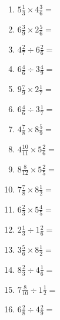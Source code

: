 \documentclass[12pt]{article}
\begin{document}
\begin{enumerate}
\item \large $ 5 \frac{1}{3} \times 4 \frac{3}{6} = $ \vspace{1.6cm}
\item \large $ 6 \frac{3}{9} \times 2 \frac{5}{6} = $ \vspace{1.6cm}
\item \large $ 4 \frac{2}{7} \div 6 \frac{2}{6} = $ \vspace{1.6cm}
\item \large $ 6 \frac{4}{6} \div 3 \frac{4}{9} = $ \vspace{1.6cm}
\item \large $ 9 \frac{7}{9} \times 2 \frac{1}{7} = $ \vspace{1.6cm}
\item \large $ 6 \frac{4}{6} \div 3 \frac{1}{7} = $ \vspace{1.6cm}
\newpage
\item \large $ 4 \frac{7}{8} \times 8 \frac{5}{9} = $ \vspace{1.6cm}
\item \large $ 4 \frac{10}{11} \times 5 \frac{2}{6} = $ \vspace{1.6cm}
\item \large $ 8 \frac{8}{12} \times 5 \frac{2}{5} = $ \vspace{1.6cm}
\item \large $ 7 \frac{7}{8} \times 8 \frac{1}{2} = $ \vspace{1.6cm}
\item \large $ 6 \frac{2}{3} \times 5 \frac{4}{5} = $ \vspace{1.6cm}
\item \large $ 2 \frac{1}{3} \div 1 \frac{2}{6} = $ \vspace{1.6cm}
\item \large $ 3 \frac{5}{6} \times 8 \frac{1}{2} = $ \vspace{1.6cm}
\item \large $ 8 \frac{2}{3} \div 4 \frac{1}{6} = $ \vspace{1.6cm}
\item \large $ 7 \frac{8}{10} \div 1 \frac{1}{2} = $ \vspace{1.6cm}
\item \large $ 6 \frac{2}{8} \div 4 \frac{2}{9} = $ \vspace{1.6cm}
\end{enumerate}
\newpage
\end{document}
